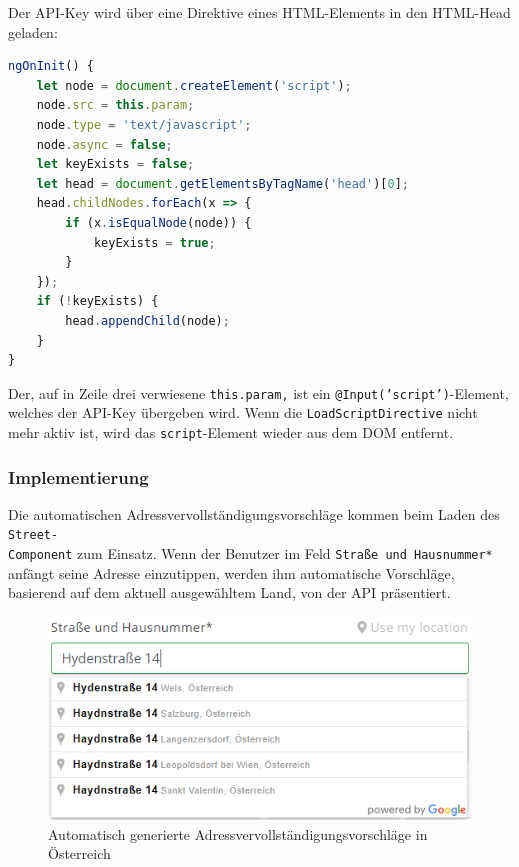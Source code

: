 Der API-Key wird über eine Direktive eines HTML-Elements in den HTML-Head geladen:

\begin{lstlisting}[caption={Die \texttt{ngOnInit()}-Methode der \texttt{LoadScriptDirective}}, language=JavaScript,label={lst:gpac}]
ngOnInit() {
	let node = document.createElement('script');
	node.src = this.param;
	node.type = 'text/javascript';
	node.async = false;
	let keyExists = false;
	let head = document.getElementsByTagName('head')[0];
	head.childNodes.forEach(x => {
		if (x.isEqualNode(node)) {
			keyExists = true;
		}
	});
	if (!keyExists) {
		head.appendChild(node);
	}
}
\end{lstlisting}

Der, auf in Zeile drei verwiesene \texttt{this.param,} ist ein \texttt{@Input('script')}-Element, welches der API-Key übergeben wird. Wenn die \texttt{LoadScriptDirective} nicht mehr aktiv ist, wird das \texttt{script}-Element wieder aus dem DOM entfernt.

\subsubsection{Implementierung}
Die automatischen Adressvervollständigungsvorschläge kommen beim Laden des \texttt{Street-\\Component} zum Einsatz. Wenn der Benutzer im Feld \texttt{Straße und Hausnummer*} anfängt seine Adresse einzutippen, werden ihm automatische Vorschläge, basierend auf dem aktuell ausgewähltem Land, von der API präsentiert. 

\begin{figure}[H]
	\centerline{
		\includegraphics[width=1\textwidth, frame]{./grafiken/open_adress_completion.PNG}
	}
	\vskip0pt
	\caption{Automatisch generierte Adressvervollständigungsvorschläge in Österreich}
\end{figure}

